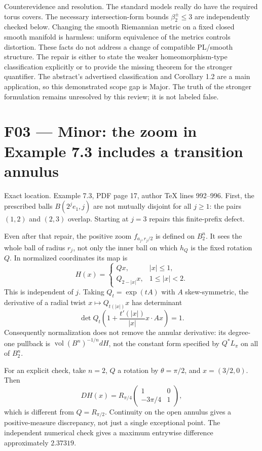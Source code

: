 \documentclass[10pt]{article}
\begin{document}
Counterevidence and resolution. The standard models really do have the required torus covers. The necessary intersection-form bounds \(\beta_2^\pm\le3\) are independently checked below. Changing the smooth Riemannian metric on a fixed closed smooth manifold is harmless: uniform equivalence of the metrics controls distortion. These facts do not address a change of compatible PL/smooth structure. The repair is either to state the weaker homeomorphism-type classification explicitly or to provide the missing theorem for the stronger quantifier. The abstract’s advertised classification and Corollary 1.2 are a main application, so this demonstrated scope gap is Major. The truth of the stronger formulation remains unresolved by this review; it is not labeled false.\par
\section*{F03 — Minor: the zoom in Example 7.3 includes a transition annulus}
Exact location. Example 7.3, PDF page 17, author TeX lines 992–996. First, the prescribed balls \(B(2^j e_1,j)\) are not mutually disjoint for all \(j\ge1\): the pairs \((1,2)\) and \((2,3)\) overlap. Starting at \(j=3\) repairs this finite-prefix defect.\par
Even after that repair, the positive zoom \(f_{a_j,r_j/2}\) is defined on \(B_2^n\). It sees the whole ball of radius \(r_j\), not only the inner ball on which \(h_Q\) is the fixed rotation \(Q\). In normalized coordinates its map is \[H(x)=
 \begin{cases}
 Qx,& |x|\le1,\\
 Q_{2-|x|}x,&1\le |x|<2.
 \end{cases}\] This is independent of \(j\). Taking \(Q_t=\exp(tA)\) with \(A\) skew-symmetric, the derivative of a radial twist \(x\mapsto Q_{t(|x|)}x\) has determinant \[\det Q_t\left(1+\frac{t'(|x|)}{|x|}x\cdot Ax\right)=1.\] Consequently normalization does not remove the annular derivative: its degree-one pullback is \(\operatorname{vol}(B^n)^{-1/n}dH\), not the constant form specified by \(Q^*L_\pi\) on all of \(B_2^n\).\par
For an explicit check, take \(n=2\), \(Q\) a rotation by \(\theta=\pi/2\), and \(x=(3/2,0)\). Then \[DH(x)=R_{\pi/4}
 \begin{pmatrix}1&0\\-3\pi/4&1\end{pmatrix},\] which is different from \(Q=R_{\pi/2}\). Continuity on the open annulus gives a positive-measure discrepancy, not just a single exceptional point. The independent numerical check gives a maximum entrywise difference approximately \(2.37319\).\par
\end{document}
